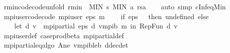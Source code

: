 \begin{isabellebody}
\endisatagproof
{\isafoldproof}%
%
\isadelimproof
\isanewline
%
\endisadelimproof
\isanewline
{}\isamarkupfalse%
\ r{\isacharunderscore}{\kern0pt}min{\isacharunderscore}{\kern0pt}code{\isacharbrackleft}{\kern0pt}code{\isacharunderscore}{\kern0pt}unfold{\isacharbrackright}{\kern0pt}{\isacharcolon}{\kern0pt}\ {\isachardoublequoteopen}r{\isacharunderscore}{\kern0pt}min\ {\isacharequal}{\kern0pt}\ {\isacharparenleft}{\kern0pt}MIN\ s{\isachardot}{\kern0pt}\ MIN\ a{\isachardot}{\kern0pt}\ r{\isacharparenleft}{\kern0pt}s{\isacharcomma}{\kern0pt}a{\isacharparenright}{\kern0pt}{\isacharparenright}{\kern0pt}{\isachardoublequoteclose}\isanewline
%
\isadelimproof
\ \ %
\endisadelimproof
%
\isatagproof
{}\isamarkupfalse%
\ {\isacharparenleft}{\kern0pt}auto\ simp{\isacharcolon}{\kern0pt}\ cInf{\isacharunderscore}{\kern0pt}eq{\isacharunderscore}{\kern0pt}Min{\isacharparenright}{\kern0pt}%
\endisatagproof
{\isafoldproof}%
%
\isadelimproof
\isanewline
%
\endisadelimproof
\isanewline
{}\isamarkupfalse%
\ mpi{\isacharunderscore}{\kern0pt}user{\isacharunderscore}{\kern0pt}code{\isacharbrackleft}{\kern0pt}code{\isacharbrackright}{\kern0pt}{\isacharcolon}{\kern0pt}\ {\isachardoublequoteopen}mpi{\isacharunderscore}{\kern0pt}user\ eps\ m\ {\isacharequal}{\kern0pt}\ \isanewline
\ \ {\isacharparenleft}{\kern0pt}if\ eps\ {\isasymle}\ {}\ then\ undefined\ else\ \isanewline
\ \ \ \ let\ {\isacharparenleft}{\kern0pt}d{\isacharcomma}{\kern0pt}\ v{\isacharparenright}{\kern0pt}\ {\isacharequal}{\kern0pt}\ mpi{\isacharunderscore}{\kern0pt}partial{\isacharprime}{\kern0pt}\ eps\ d{}{\isacharprime}{\kern0pt}\ v{}{\isacharunderscore}{\kern0pt}mpi\isactrlsub b\ m\ in\ {\isacharparenleft}{\kern0pt}Rep{\isacharunderscore}{\kern0pt}Fun\ d{\isacharcomma}{\kern0pt}\ v{\isacharparenright}{\kern0pt}{\isacharparenright}{\kern0pt}{\isachardoublequoteclose}\isanewline
%
\isadelimproof
\ \ %
\endisadelimproof
%
\isatagproof
{}\isamarkupfalse%
\ mpi{\isacharunderscore}{\kern0pt}user{\isacharunderscore}{\kern0pt}def\ case{\isacharunderscore}{\kern0pt}prod{\isacharunderscore}{\kern0pt}beta\ mpi{\isacharunderscore}{\kern0pt}partial{\isacharprime}{\kern0pt}{\isacharunderscore}{\kern0pt}def\isanewline
\ \ \isamarkupfalse%
\ mpi{\isacharunderscore}{\kern0pt}partial{\isacharunderscore}{\kern0pt}eq{\isacharunderscore}{\kern0pt}algo\ A{\isacharunderscore}{\kern0pt}ne\ v{}{\isacharunderscore}{\kern0pt}mpi\isactrlsub b{\isacharunderscore}{\kern0pt}le{\isacharunderscore}{\kern0pt}{\isasymL}\isactrlsub b\ d{}{\isacharunderscore}{\kern0pt}dec{\isacharunderscore}{\kern0pt}det\isanewline

\end{isabellebody}
